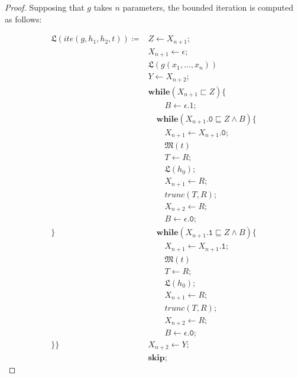\documentclass[10pt]{amsart}
\newcommand{\zero}{\mathtt{0}}
\newcommand{\one}{\mathtt{1}}
\newcommand{\vone}{x}
\newcommand{\while}[2]{\mathbf{while}(#1)\{#2\}}
\newcommand{\sk}{\mathbf{skip};}
\newcommand{\takes}{\leftarrow}
\newcommand{\LL}{\mathfrak L}
\newcommand{\MM}{\mathfrak M}
\begin{document}
\begin{proof}
Supposing that $g$ takes $n$ parameters, the bounded iteration is computed as follows:

\begin{align*}
\LL(ite(g, h_1, h_2, t))\coloneqq
&Z \takes X_{n+1};\\
&X_{n+1} \takes \epsilon;\\
& \LL(g(\vone_1, \ldots, \vone_n))\\
& Y \takes X_{n+2};\\
& \while {X_{n+1} \sqsubset Z} {\\
&\quad\quad B \takes \epsilon.1;\\
&\quad \while{X_{n+1}.\zero\sqsubseteq Z \land B}{\\
&\quad\quad X_{n+1}\takes X_{n+1}.\zero;\\
&\quad\quad \MM(t)\\
&\quad\quad T \takes R;\\
&\quad \quad \LL(h_0);\\
&\quad\quad X_{n+1}\takes R;\\
&\quad\quad trunc(T, R);\\
&\quad\quad X_{n+2} \takes R;\\
&\quad\quad B \takes \epsilon.\zero;\\
 }
& \quad \while{X_{n+1}.\one\sqsubseteq Z \land B}{\\
&\quad\quad X_{n+1}\takes X_{n+1}.\one;\\
&\quad\quad \MM(t)\\
&\quad\quad T \takes R;\\
&\quad \quad \LL(h_0);\\
&\quad\quad X_{n+1}\takes R;\\
&\quad\quad trunc(T, R);\\
&\quad\quad X_{n+2} \takes R;\\
&\quad\quad B \takes \epsilon.\zero;\\
 }
}
&X_{n+2}\takes Y;\\
&\sk
\end{align*}
\end{proof}
\end{document}
